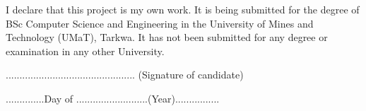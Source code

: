 



\begin{declaration} %
	I declare that this project is my own work. It is being submitted for the degree of BSc Computer Science and Engineering in the University of Mines and Technology (UMaT), Tarkwa. It has not been submitted for any degree or examination in any other University.
	\vspace{3.0cm}
	
	...............................................
	\newline
	(Signature of candidate)
	
	\vspace{1.0cm}
	
	..............Day of ..........................(Year)................
	
\end{declaration}




